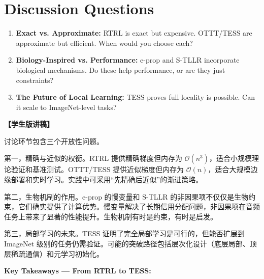 \documentclass[journal,12pt,onecolumn]{IEEEtran}
\begin{document}
\section{Discussion Questions}

\begin{enumerate}
    \item \textbf{Exact vs. Approximate:} RTRL is exact but expensive. OTTT/TESS are approximate but efficient. When would you choose each?
    \item \textbf{Biology-Inspired vs. Performance:} e-prop and S-TLLR incorporate biological mechanisms. Do these help performance, or are they just constraints?
    \item \textbf{The Future of Local Learning:} TESS proves full locality is possible. Can it scale to ImageNet-level tasks?
\end{enumerate}

\textbf{【学生版讲稿】}

讨论环节包含三个开放性问题。

第一，精确与近似的权衡。RTRL 提供精确梯度但内存为 $\mathcal{O}(n^3)$，适合小规模理论验证和基准测试。OTTT/TESS 提供近似梯度但内存为 $\mathcal{O}(n)$，适合大规模边缘部署和实时学习。实践中可采用“先精确后近似”的渐进策略。

第二，生物机制的作用。e-prop 的慢变量和 S-TLLR 的非因果项不仅仅是生物约束，它们确实提供了计算优势。慢变量解决了长期信用分配问题，非因果项在音频任务上带来了显著的性能提升。生物机制有时是约束，有时是启发。

第三，局部学习的未来。TESS 证明了完全局部学习是可行的，但能否扩展到 ImageNet 级别的任务仍需验证。可能的突破路径包括层次化设计（底层局部、顶层稀疏通信）和元学习初始化。


\bigskip\noindent\textbf{Key Takeaways — From RTRL to TESS:}
\end{document}
